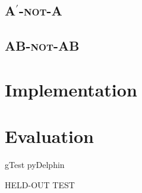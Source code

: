 \documentclass[11pt]{article}
\begin{document}
\subsection{\textsc{A\ensuremath{^\prime}-not-A}}
\label{ssec:contracted}



\subsection{\textsc{AB-not-AB}}
\label{ssec:phrasal}




\section{Implementation}
\label{sec:implemetation}


\section{Evaluation}
\label{sec:evaluation}

gTest 
pyDelphin


HELD-OUT
TEST











\end{document}
